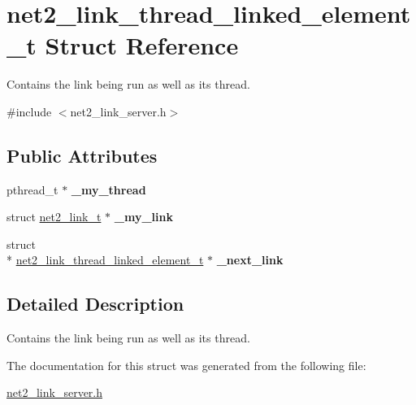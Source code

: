 \hypertarget{structnet2__link__thread__linked__element__t}{\section{net2\-\_\-link\-\_\-thread\-\_\-linked\-\_\-element\-\_\-t Struct Reference}
\label{structnet2__link__thread__linked__element__t}
}


Contains the link being run as well as its thread.  




{\ttfamily \#include $<$net2\-\_\-link\-\_\-server.\-h$>$}

\subsection*{Public Attributes}
\begin{DoxyCompactItemize}
\item 
\hypertarget{structnet2__link__thread__linked__element__t_a4de69b752a1213f5cc228e1dd8f83b95}{pthread\-\_\-t $\ast$ {\bfseries \-\_\-my\-\_\-thread}}\label{structnet2__link__thread__linked__element__t_a4de69b752a1213f5cc228e1dd8f83b95}

\item 
\hypertarget{structnet2__link__thread__linked__element__t_a99b68d692f86432ad06502f28f89c175}{struct \hyperlink{structnet2__link__t}{net2\-\_\-link\-\_\-t} $\ast$ {\bfseries \-\_\-my\-\_\-link}}\label{structnet2__link__thread__linked__element__t_a99b68d692f86432ad06502f28f89c175}

\item 
\hypertarget{structnet2__link__thread__linked__element__t_aee53ad34cc55f3b702c5395a5728879d}{struct \\*
\hyperlink{structnet2__link__thread__linked__element__t}{net2\-\_\-link\-\_\-thread\-\_\-linked\-\_\-element\-\_\-t} $\ast$ {\bfseries \-\_\-next\-\_\-link}}\label{structnet2__link__thread__linked__element__t_aee53ad34cc55f3b702c5395a5728879d}

\end{DoxyCompactItemize}


\subsection{Detailed Description}
Contains the link being run as well as its thread. 

The documentation for this struct was generated from the following file\-:\begin{DoxyCompactItemize}
\item 
\hyperlink{net2__link__server_8h}{net2\-\_\-link\-\_\-server.\-h}\end{DoxyCompactItemize}

